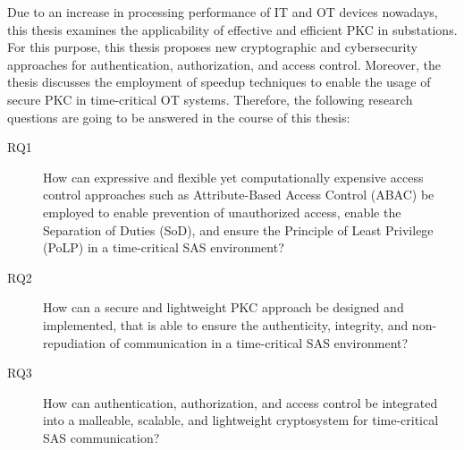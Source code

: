 Due to an increase in processing performance of IT and OT devices nowadays, this thesis examines the applicability of effective and efficient PKC in substations.
For this purpose, this thesis proposes new cryptographic and cybersecurity approaches for authentication, authorization, and access control.
Moreover, the thesis discusses the employment of speedup techniques to enable the usage of secure PKC in time-critical OT systems.
Therefore, the following research questions are going to be answered in the course of this thesis:
\begin{description}
    \item[RQ1] How can expressive and flexible yet computationally expensive access control approaches such as Attribute-Based Access Control (ABAC) be employed to enable prevention of unauthorized access, enable the Separation of Duties (SoD), and ensure the Principle of Least Privilege (PoLP) in a time-critical SAS environment?
    \item[RQ2] How can a secure and lightweight PKC approach be designed and implemented, that is able to ensure the authenticity, integrity, and non-repudiation of communication in a time-critical SAS environment?
    \item[RQ3] How can authentication, authorization, and access control be integrated into a malleable, scalable, and lightweight cryptosystem for time-critical SAS communication?
\end{description}

